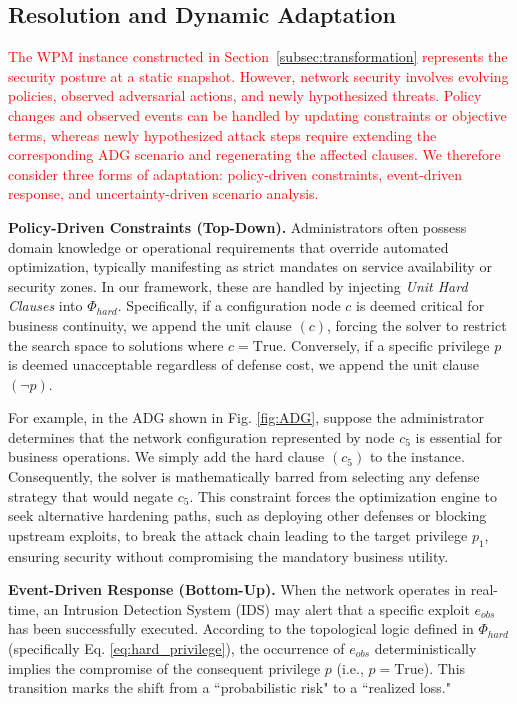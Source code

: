 \documentclass[conference]{IEEEtran}
\theoremstyle{definition} %
\theoremstyle{plain} %
\begin{document}
\subsection{Resolution and Dynamic Adaptation}
\label{subsec:dynamic_adaptation}

\textcolor{red}{The WPM instance constructed in Section~\ref{subsec:transformation} represents the security posture at a static snapshot. However, network security involves evolving policies, observed adversarial actions, and newly hypothesized threats. Policy changes and observed events can be handled by updating constraints or objective terms, whereas newly hypothesized attack steps require extending the corresponding ADG scenario and regenerating the affected clauses. We therefore consider three forms of adaptation: policy-driven constraints, event-driven response, and uncertainty-driven scenario analysis.}

\textbf{Policy-Driven Constraints (Top-Down).} Administrators often possess domain knowledge or operational requirements that override automated optimization, typically manifesting as strict mandates on service availability or security zones. In our framework, these are handled by injecting \textit{Unit Hard Clauses} into $\Phi_{hard}$. Specifically, if a configuration node $c$ is deemed critical for business continuity, we append the unit clause $(c)$, forcing the solver to restrict the search space to solutions where $c=\text{True}$. Conversely, if a specific privilege $p$ is deemed unacceptable regardless of defense cost, we append the unit clause $(\neg p)$. 

For example, in the ADG shown in Fig. \ref{fig:ADG}, suppose the administrator determines that the network configuration represented by node $c_5$ is essential for business operations. We simply add the hard clause $(c_5)$ to the instance. Consequently, the solver is mathematically barred from selecting any defense strategy that would negate $c_5$. This constraint forces the optimization engine to seek alternative hardening paths, such as deploying other defenses or blocking upstream exploits, to break the attack chain leading to the target privilege $p_1$, ensuring security without compromising the mandatory business utility.

\textbf{Event-Driven Response (Bottom-Up).} When the network operates in real-time, an Intrusion Detection System (IDS) may alert that a specific exploit $e_{obs}$ has been successfully executed. According to the topological logic defined in $\Phi_{hard}$ (specifically Eq. \eqref{eq:hard_privilege}), the occurrence of $e_{obs}$ deterministically implies the compromise of the consequent privilege $p$ (i.e., $p=\text{True}$). This transition marks the shift from a ``probabilistic risk" to a ``realized loss." 
\end{document}
